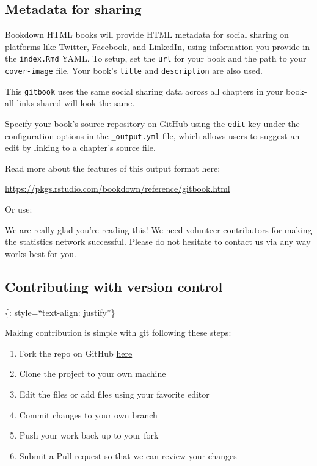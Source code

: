 \documentclass[
]{article}
\providecommand{\tightlist}{%
  \setlength{\itemsep}{0pt}\setlength{\parskip}{0pt}}
\theoremstyle{definition}
\theoremstyle{definition}
\theoremstyle{definition}
\theoremstyle{definition}
\theoremstyle{remark}
\begin{document}
\hypertarget{metadata-for-sharing}{%
\subsection{Metadata for sharing}\label{metadata-for-sharing}}

Bookdown HTML books will provide HTML metadata for social sharing on platforms like Twitter, Facebook, and LinkedIn, using information you provide in the \texttt{index.Rmd} YAML. To setup, set the \texttt{url} for your book and the path to your \texttt{cover-image} file. Your book's \texttt{title} and \texttt{description} are also used.

This \texttt{gitbook} uses the same social sharing data across all chapters in your book- all links shared will look the same.

Specify your book's source repository on GitHub using the \texttt{edit} key under the configuration options in the \texttt{\_output.yml} file, which allows users to suggest an edit by linking to a chapter's source file.

Read more about the features of this output format here:

\url{https://pkgs.rstudio.com/bookdown/reference/gitbook.html}

Or use:

We are really glad you're reading this! We need volunteer contributors for making the statistics network successful. Please do not hesitate to contact us via any way works best for you.

\hypertarget{contributing-with-version-control}{%
\subsection{Contributing with version control}\label{contributing-with-version-control}}

\{: style=``text-align: justify''\}

Making contribution is simple with git following these steps:

\begin{enumerate}
\def\labelenumi{\arabic{enumi}.}
\tightlist
\item
  Fork the repo on GitHub \href{https://github.com/davan690/davan690.github.io}{here}
\item
  Clone the project to your own machine
\item
  Edit the files or add files using your favorite editor
\item
  Commit changes to your own branch
\item
  Push your work back up to your fork
\item
  Submit a Pull request so that we can review your changes
\end{enumerate}
\end{document}
